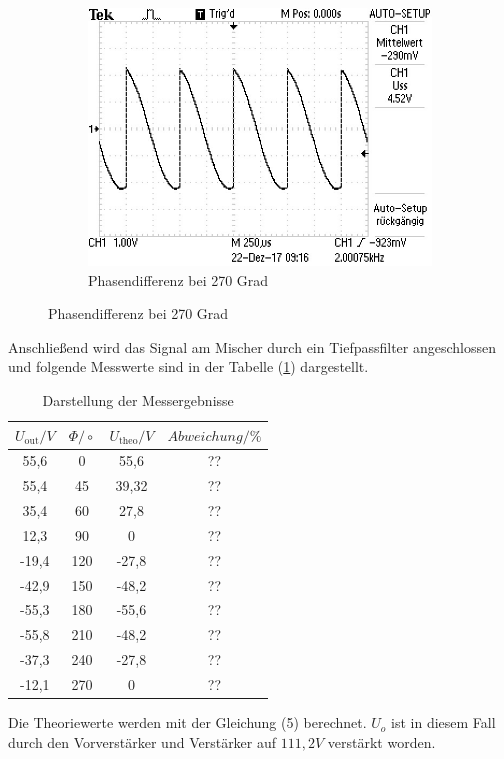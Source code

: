 \begin{figure}[H]
\begin{subfigure}{0.48\textwidth}
	\includegraphics[width=\textwidth]{270Grad.JPG}
  \caption{Phasendifferenz bei 270 Grad}
\end{subfigure}
\end{figure}

Anschließend wird das Signal am Mischer durch ein Tiefpassfilter angeschlossen und folgende
Messwerte sind in der Tabelle (\ref{tab:1}) dargestellt.
\begin{table}[H]
\centering
\caption{Darstellung der Messergebnisse}
\label{tab:1}
 \begin{tabular}{c c c c}
  \toprule
     $U_\text{out} / V$ & $\Phi/\circ$ & $U_\text{theo} / V$ & $Abweichung / \%$ \\
  \midrule
  55,6  & 0   & 55,6  &??\\
  55,4  & 45  & 39,32 &??\\
  35,4  & 60  & 27,8  &??\\
  12,3  & 90  &   0   &??\\
  -19,4 & 120 &-27,8  &??\\
  -42,9 & 150 &-48,2  &??\\
  -55,3 & 180 &-55,6  &??\\
  -55,8 & 210 &-48,2  &??\\
  -37,3 & 240 &-27,8  &??\\
  -12,1 & 270 &   0   &??\\
  \bottomrule
\end{tabular}
\end{table}
Die Theoriewerte werden mit der Gleichung (5) berechnet. $U_o$ ist in diesem Fall durch den Vorverstärker
und Verstärker auf $111,2 V$ verstärkt worden.


